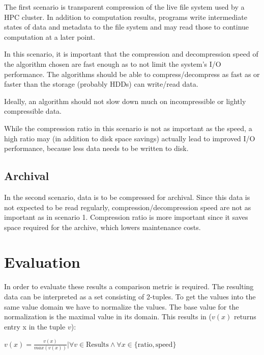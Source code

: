\documentclass[
	12pt,
	a4paper,
	BCOR10mm,
	DIV14,
	listof=totoc,
	bibliography=totoc,
	headsepline
]{scrreprt}
\begin{document}
The first scenario is transparent compression of the live file system used by a HPC cluster. In addition to computation results, programs write intermediate states of data and metadata to the file system and may read those to continue computation at a later point.

In this scenario, it is important that the compression and decompression speed of the algorithm chosen are fast enough as to not limit the system's I/O performance.  The algorithms should be able to compress/decompress as fast as or faster than the storage (probably HDDs) can write/read data.

Ideally, an algorithm should not slow down much on incompressible or lightly compressible data.

While the compression ratio in this scenario is not as important as the speed, a high ratio may (in addition to disk space savings) actually lead to improved I/O performance, because less data needs to be written to disk.

\subsection{Archival}

In the second scenario, data is to be compressed for archival. Since this data is not expected to be read regularly, compression/decompression speed are not as important as in scenario 1. Compression ratio is more important since it saves space required for the archive, which lowers maintenance costs.

\section{Evaluation}
In order to evaluate these results a comparison metric is required.
The resulting data can be interpreted as a set consisting of 2-tuples.
To get the values into the same value domain we have to normalize the values.
The base value for the normalization is the maximal value in its domain.
This results in (\(v(x)\) returns entry x in the tuple \(v\)):
\begin{center}
	\(
	   v(x) = \frac{v(x)}{max(v(x))}|\forall v \in \text{Results} \land \forall x \in \{\text{ratio}, \text{speed}\}
	\)
\end{center}
\end{document}
